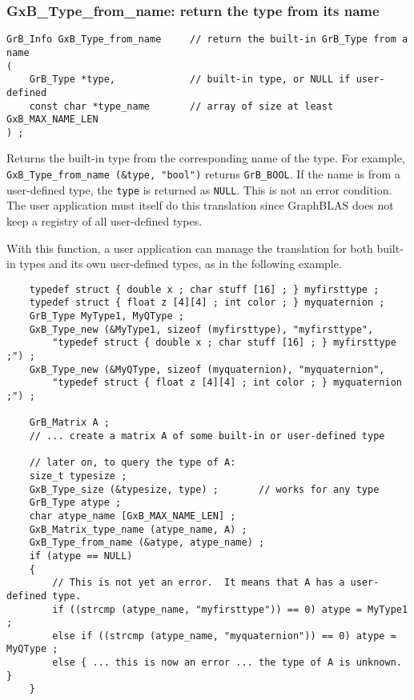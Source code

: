 \documentclass[12pt]{article}
\begin{document}
{\newpage
\subsubsection{{\sf GxB\_Type\_from\_name:} return the type from its name}
\label{type_from_name}

\begin{mdframed}[userdefinedwidth=6in]
{\footnotesize
\begin{verbatim}
GrB_Info GxB_Type_from_name     // return the built-in GrB_Type from a name
(
    GrB_Type *type,             // built-in type, or NULL if user-defined
    const char *type_name       // array of size at least GxB_MAX_NAME_LEN
) ;
\end{verbatim}
}\end{mdframed}

Returns the built-in type from the corresponding name of the type.  For
example, \verb'GxB_Type_from_name (&type, "bool")' returns \verb'GrB_BOOL'.  If
the name is from a user-defined type, the \verb'type' is returned as
\verb'NULL'.  This is not an error condition.  The user application must itself
do this translation since GraphBLAS does not keep a registry of all
user-defined types.

With this function, a user application can manage the translation for
both built-in types and its own user-defined types, as in the following
example.

{\footnotesize
\begin{verbatim}
    typedef struct { double x ; char stuff [16] ; } myfirsttype ;
    typedef struct { float z [4][4] ; int color ; } myquaternion ;
    GrB_Type MyType1, MyQType ;
    GxB_Type_new (&MyType1, sizeof (myfirsttype), "myfirsttype",
        "typedef struct { double x ; char stuff [16] ; } myfirsttype ;") ;
    GxB_Type_new (&MyQType, sizeof (myquaternion), "myquaternion",
        "typedef struct { float z [4][4] ; int color ; } myquaternion ;") ;

    GrB_Matrix A ;
    // ... create a matrix A of some built-in or user-defined type

    // later on, to query the type of A:
    size_t typesize ;
    GxB_Type_size (&typesize, type) ;       // works for any type
    GrB_Type atype ;
    char atype_name [GxB_MAX_NAME_LEN] ;
    GxB_Matrix_type_name (atype_name, A) ;
    GxB_Type_from_name (&atype, atype_name) ;
    if (atype == NULL)
    {
        // This is not yet an error.  It means that A has a user-defined type.
        if ((strcmp (atype_name, "myfirsttype")) == 0) atype = MyType1 ;
        else if ((strcmp (atype_name, "myquaternion")) == 0) atype = MyQType ;
        else { ... this is now an error ... the type of A is unknown.  }
    }\end{verbatim} }

}
\end{document}
